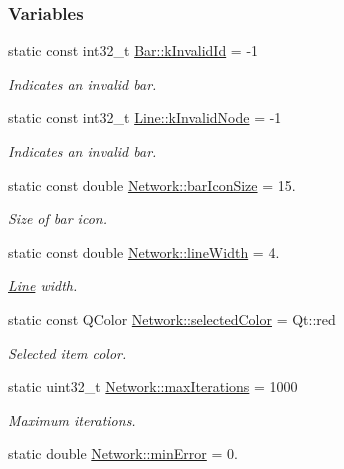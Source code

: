 \subsubsection*{Variables}
\begin{DoxyCompactItemize}
\item 
static const int32\+\_\+t \hyperlink{group___models_ga9919592c0397ed41448dfb20b607d738}{Bar\+::k\+Invalid\+Id} = -\/1
\begin{DoxyCompactList}\small\item\em Indicates an invalid bar. \end{DoxyCompactList}\item 
static const int32\+\_\+t \hyperlink{group___models_gadc334bd07c6126abc56e531d7e3e72b4}{Line\+::k\+Invalid\+Node} = -\/1
\begin{DoxyCompactList}\small\item\em Indicates an invalid bar. \end{DoxyCompactList}\item 
static const double \hyperlink{group___models_gaa334bbc93b3fde219840e95e23198b53}{Network\+::bar\+Icon\+Size} = 15.
\begin{DoxyCompactList}\small\item\em Size of bar icon. \end{DoxyCompactList}\item 
static const double \hyperlink{group___models_ga3f810634c9908d62d33a1ab09a76c147}{Network\+::line\+Width} = 4.
\begin{DoxyCompactList}\small\item\em \hyperlink{class_line}{Line} width. \end{DoxyCompactList}\item 
static const Q\+Color \hyperlink{group___models_gaa9e21b8e2a24b0495e776a51e1aeed94}{Network\+::selected\+Color} = Qt\+::red
\begin{DoxyCompactList}\small\item\em Selected item color. \end{DoxyCompactList}\item 
static uint32\+\_\+t \hyperlink{group___models_ga318dee060bc577eacd67d332efbbe1b2}{Network\+::max\+Iterations} = 1000
\begin{DoxyCompactList}\small\item\em Maximum iterations. \end{DoxyCompactList}\item 
static double \hyperlink{group___models_gabcdc973129d3dda7572b7a1c388da1b5}{Network\+::min\+Error} = 0.

\end{DoxyCompactItemize}

